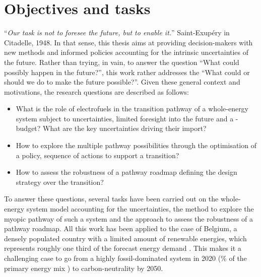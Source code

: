 \section*{Objectives and tasks}
``\textit{Our task is not to foresee the future, but to enable it.}'' Saint-Exupéry in Citadelle, 1948. In that sense, this thesis aims at providing decision-makers with new methods and informed policies accounting for the intrinsic uncertainties of the future.  Rather than trying, in vain, to answer the question ``What could possibly happen in the future?'', this work rather addresses the ``What could or should we do to make the future possible?''. Given these general context and motivations, the research questions are described as follows:
\begin{itemize}
\item What is the role of electrofuels in the transition pathway of a whole-energy system subject to uncertainties, limited foresight into the future and a -budget? What are the key uncertainties driving their import?
\item How to explore the multiple pathway possibilities through the optimisation of a policy, \ie sequence of actions to support a transition?
\item How to assess the robustness of a pathway roadmap defining the design strategy over the transition?
\end{itemize}

To answer these questions, several tasks have been carried out on the whole-energy system model accounting for the uncertainties, the method to explore the myopic pathway of such a system and the approach to assess the robustness of a pathway roadmap.  All this work has been applied to the case of Belgium, a densely populated country with a limited amount of renewable energies, which represents roughly one third of the forecast energy demand \cite{Limpens2020}. This makes it a challenging case to go from a highly fossil-dominated system in 2020 (\% of the primary energy mix \cite{spf_economy_2022}) to carbon-neutrality by 2050. 

